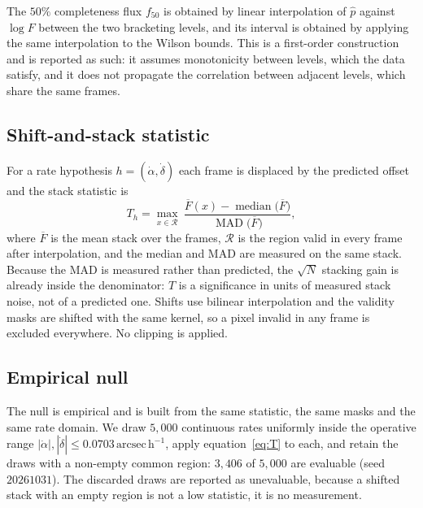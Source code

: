 \documentclass[11pt,a4paper]{article}
\newcommand{\unit}[1]{\,\mathrm{#1}}
\newcommand{\arcsec}{\unit{arcsec}}
\begin{document}
The $50\%$ completeness flux $f_{50}$ is obtained by linear interpolation of
$\hat p$ against $\log F$ between the two bracketing levels, and its interval is
obtained by applying the same interpolation to the Wilson bounds. This is a
first-order construction and is reported as such: it assumes monotonicity between
levels, which the data satisfy, and it does not propagate the correlation between
adjacent levels, which share the same frames.

\subsection{Shift-and-stack statistic}
For a rate hypothesis $h = (\dot\alpha, \dot\delta)$ each frame is displaced by the
predicted offset and the stack statistic is
\begin{equation}
T_h = \max_{x\in\mathcal{R}}\ \frac{\overline{F}(x) - \operatorname{median}\big(\overline{F}\big)}
{\operatorname{MAD}\big(\overline{F}\big)},
\label{eq:T}
\end{equation}
where $\overline{F}$ is the mean stack over the frames, $\mathcal{R}$ is the region
valid in every frame after interpolation, and the median and MAD are measured on
the same stack. Because the MAD is measured rather than predicted, the
$\sqrt{N}$ stacking gain is already inside the denominator: $T$ is a significance
in units of measured stack noise, not of a predicted one. Shifts use bilinear
interpolation and the validity masks are shifted with the same kernel, so a pixel
invalid in any frame is excluded everywhere. No clipping is applied.

\subsection{Empirical null}
The null is empirical and is built from the same statistic, the same masks and the
same rate domain. We draw $5{,}000$ continuous rates uniformly inside the
operative range $|\dot\alpha|,|\dot\delta|\le 0.0703\arcsec\unit{h}^{-1}$, apply
equation~\eqref{eq:T} to each, and retain the draws with a non-empty common
region: $3{,}406$ of $5{,}000$ are evaluable (seed $20261031$). The discarded
draws are reported as unevaluable, because a shifted stack with an empty region is
not a low statistic, it is no measurement.
\end{document}
